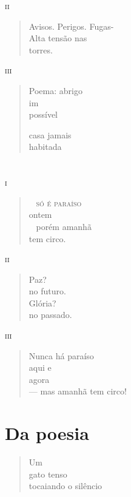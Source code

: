 \medskip
\textsc{ii}

\begin{verse}
Avisos. Perigos. Fugas-\\
Alta tensão nas\\
\qquad\qquad\qquad torres.
\end{verse}

\medskip
\textsc{iii}

\begin{verse}
Poema: abrigo\\
im\\
possível

casa jamais\\
habitada
\end{verse}

\chapter*{}
\forceindent\textsc{i}

\begin{verse}
\qquad\mbox{ } \textsc{só é paraíso}\\
ontem\\
\qquad\mbox{ } porém amanhã\\
tem circo.
\end{verse}

\medskip
\textsc{ii}

\begin{verse}
Paz?\\
no futuro.\\
Glória?\\
no passado.
\end{verse}

\medskip
\textsc{iii}

\begin{verse}
Nunca há paraíso\\
aqui e\\
agora\\
--- mas amanhã tem circo!
\end{verse}


\chapter{Da poesia}

\begin{verse}
Um\\
gato tenso\\
tocaiando o silêncio
\end{verse}

